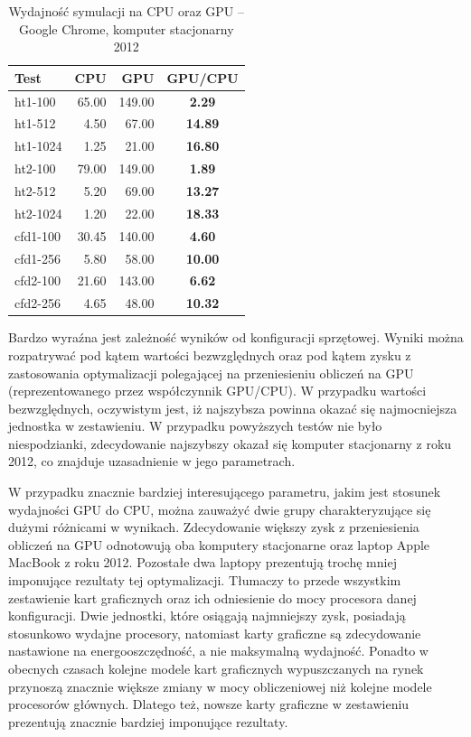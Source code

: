 \clearpage

\begin{table}[!htp]
\caption{Wydajność symulacji na CPU oraz GPU -- Google Chrome, komputer stacjonarny 2012}
\centering
\begin{tabular}{|l|r|r|>{\bfseries}c|}
\hline
\cellcolor{t} Test & \cellcolor{cpu} CPU & \cellcolor{gpu} GPU & \cellcolor{gc} GPU/CPU \\ \hline
ht1-100 & 65.00 & 149.00 & 2.29 \\ \hline
ht1-512 & 4.50 & 67.00 & 14.89 \\ \hline
ht1-1024 & 1.25 & 21.00 & 16.80 \\ \hline
ht2-100 & 79.00 & 149.00 & 1.89 \\ \hline
ht2-512 & 5.20 & 69.00 & 13.27 \\ \hline
ht2-1024 & 1.20 & 22.00 & 18.33 \\ \hline
\hline
cfd1-100 & 30.45 & 140.00 & 4.60 \\ \hline
cfd1-256 & 5.80 & 58.00 & 10.00 \\ \hline
cfd2-100 & 21.60 & 143.00 & 6.62 \\ \hline
cfd2-256 & 4.65 & 48.00 & 10.32 \\ \hline
\end{tabular}
\label{tab:wynikiWebGL_last}
\end{table}

Bardzo wyraźna jest zależność wyników od konfiguracji sprzętowej. Wyniki można
rozpatrywać pod kątem wartości bezwzględnych oraz pod kątem zysku z zastosowania
optymalizacji polegającej na przeniesieniu obliczeń na GPU (reprezentowanego
przez współczynnik GPU/CPU). W przypadku wartości bezwzględnych, oczywistym
jest, iż najszybsza powinna okazać się najmocniejsza jednostka w zestawieniu. W
przypadku powyższych testów nie było niespodzianki, zdecydowanie najszybszy
okazał się komputer stacjonarny z roku 2012, co znajduje uzasadnienie w jego
parametrach.

W przypadku znacznie bardziej interesującego parametru, jakim jest stosunek
wydajności GPU do CPU, można zauważyć dwie grupy charakteryzujące się dużymi
różnicami w wynikach. Zdecydowanie większy zysk z przeniesienia obliczeń na GPU
odnotowują oba komputery stacjonarne oraz laptop Apple MacBook z roku 2012.
Pozostałe dwa laptopy prezentują trochę mniej imponujące rezultaty tej
optymalizacji. Tłumaczy to przede wszystkim zestawienie kart graficznych oraz
ich odniesienie do mocy procesora danej konfiguracji. Dwie jednostki, które
osiągają najmniejszy zysk, posiadają stosunkowo wydajne procesory, natomiast
karty graficzne są zdecydowanie nastawione na energooszczędność, a nie
maksymalną wydajność. Ponadto w obecnych czasach kolejne modele kart
graficznych wypuszczanych na rynek przynoszą znacznie większe zmiany w mocy
obliczeniowej niż kolejne modele procesorów głównych. Dlatego też, nowsze karty
graficzne w zestawieniu prezentują znacznie bardziej imponujące rezultaty.

